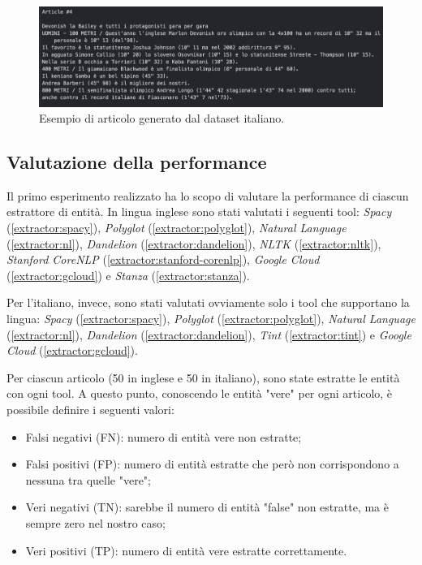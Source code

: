 \documentclass[a4paper,11pt]{article}
\begin{document}
\begin{figure}[H]
\centering
\includegraphics[width=1\textwidth]{img/article_4}
\caption{Esempio di articolo generato dal dataset italiano.}
\label{fig:article_4}
\end{figure}

\subsection{Valutazione della performance}
Il primo esperimento realizzato ha lo scopo di valutare la performance di ciascun estrattore di entità.
In lingua inglese sono stati valutati i seguenti tool: \textit{Spacy} (\ref{extractor:spacy}),  \textit{Polyglot} (\ref{extractor:polyglot}), \textit{Natural Language} (\ref{extractor:nl}), \textit{Dandelion} (\ref{extractor:dandelion}), \textit{NLTK} (\ref{extractor:nltk}), \textit{Stanford CoreNLP} (\ref{extractor:stanford-corenlp}), \textit{Google Cloud} (\ref{extractor:gcloud}) e \textit{Stanza} (\ref{extractor:stanza}).

Per l'italiano, invece, sono stati valutati ovviamente solo i tool che supportano la lingua: \textit{Spacy} (\ref{extractor:spacy}), \textit{Polyglot} (\ref{extractor:polyglot}), \textit{Natural Language} (\ref{extractor:nl}), \textit{Dandelion} (\ref{extractor:dandelion}), \textit{Tint} (\ref{extractor:tint}) e \textit{Google Cloud} (\ref{extractor:gcloud}).
\newline

Per ciascun articolo (50 in inglese e 50 in italiano), sono state estratte le entità con ogni tool.
A questo punto, conoscendo le entità "vere" per ogni articolo, è possibile definire i seguenti valori:

\begin{itemize}
  \item Falsi negativi (FN): numero di entità vere non estratte;
  \item Falsi positivi (FP): numero di entità estratte che però non corrispondono a nessuna tra quelle "vere";
  \item Veri negativi (TN): sarebbe il numero di entità "false" non estratte, ma è sempre zero nel nostro caso;
  \item Veri positivi (TP): numero di entità vere estratte correttamente.
\end{itemize}
\end{document}
